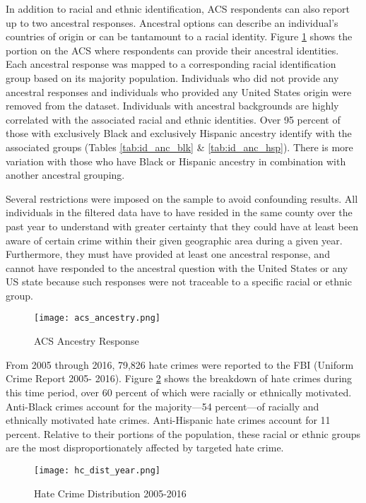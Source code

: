 \documentclass{article}
\begin{document}
    In addition to racial and ethnic identification, ACS respondents can also report up to two ancestral responses. Ancestral options can describe an individual’s countries of origin or can  be tantamount to a racial identity. Figure \ref{fig:acs_anc} shows the portion on the ACS where respondents can provide their ancestral identities. Each ancestral response was mapped to a corresponding racial identification group based on its majority population. Individuals who did not provide any ancestral responses and individuals who provided any United States origin were removed from the dataset. Individuals with ancestral backgrounds are highly correlated with the associated racial and ethnic identities. Over 95 percent of those with exclusively Black and exclusively Hispanic ancestry identify with the associated groups (Tables \ref{tab:id_anc_blk} \& \ref{tab:id_anc_hsp}). There is more variation with those who have Black or Hispanic ancestry in combination with another ancestral grouping.
    
    Several restrictions were imposed on the sample to avoid confounding results. All individuals in the filtered data have to have resided in the same county over the past year to understand with greater certainty that they could have at least been aware of certain crime within their given geographic area during a given year. Furthermore, they must have provided at least one ancestral response, and cannot have responded to the ancestral question with the United States or any US state because such responses were not traceable to a specific racial or ethnic group. 
       
    \begin{figure}[h]
        \caption{ACS Ancestry Response}
        \texttt{[image: acs\_ancestry.png]}
        \label{fig:acs_anc}
        \centering
    \end{figure}
    
    From 2005 through 2016, 79,826 hate crimes were reported to the FBI (Uniform Crime Report 2005- 2016). Figure \ref{fig:hc} shows the breakdown of hate crimes during this time period, over 60 percent of which were racially or ethnically motivated. Anti-Black crimes account for the majority---54 percent---of racially and ethnically motivated hate crimes. Anti-Hispanic hate crimes account for 11 percent. Relative to their portions of the population, these racial or ethnic groups are the most disproportionately affected by targeted hate crime.  
    
    \begin{figure}[h]
        \caption{Hate Crime Distribution 2005-2016}
        \texttt{[image: hc\_dist\_year.png]}
        \label{fig:hc}
        \centering
    \end{figure}
    
\end{document}
